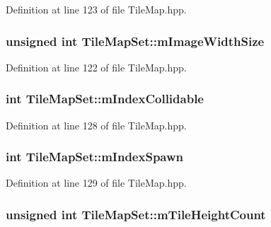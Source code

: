 Definition at line 123 of file Tile\-Map.\-hpp.

\hypertarget{class_tile_map_set_ad70411018be2b8ce950e00b70020c703}{
\subsubsection[{m\-Image\-Width\-Size}]{\setlength{\rightskip}{0pt plus 5cm}unsigned int Tile\-Map\-Set\-::m\-Image\-Width\-Size\hspace{0.3cm}{\ttfamily [protected]}}}\label{class_tile_map_set_ad70411018be2b8ce950e00b70020c703}


Definition at line 122 of file Tile\-Map.\-hpp.

\hypertarget{class_tile_map_set_a02448f7bf82af58a2b660b7c4811479d}{
\subsubsection[{m\-Index\-Collidable}]{\setlength{\rightskip}{0pt plus 5cm}int Tile\-Map\-Set\-::m\-Index\-Collidable\hspace{0.3cm}{\ttfamily [protected]}}}\label{class_tile_map_set_a02448f7bf82af58a2b660b7c4811479d}


Definition at line 128 of file Tile\-Map.\-hpp.

\hypertarget{class_tile_map_set_abdcf3d4f5e9d82aeba620a7358068a42}{
\subsubsection[{m\-Index\-Spawn}]{\setlength{\rightskip}{0pt plus 5cm}int Tile\-Map\-Set\-::m\-Index\-Spawn\hspace{0.3cm}{\ttfamily [protected]}}}\label{class_tile_map_set_abdcf3d4f5e9d82aeba620a7358068a42}


Definition at line 129 of file Tile\-Map.\-hpp.

\hypertarget{class_tile_map_set_a6bd7b84fef3fdd9fb1312e256ec55b4a}{
\subsubsection[{m\-Tile\-Height\-Count}]{\setlength{\rightskip}{0pt plus 5cm}unsigned int Tile\-Map\-Set\-::m\-Tile\-Height\-Count\hspace{0.3cm}{\ttfamily [protected]}}}\label{class_tile_map_set_a6bd7b84fef3fdd9fb1312e256ec55b4a}


